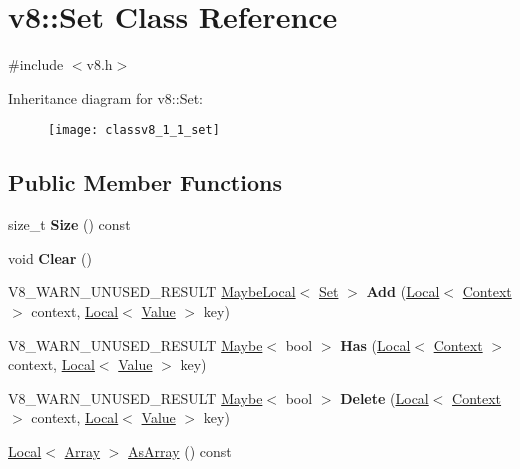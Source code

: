 \hypertarget{classv8_1_1_set}{}\section{v8\+:\+:Set Class Reference}
\label{classv8_1_1_set}


{\ttfamily \#include $<$v8.\+h$>$}

Inheritance diagram for v8\+:\+:Set\+:\begin{figure}[H]
\begin{center}
\leavevmode
\texttt{[image: classv8\_1\_1\_set]}
\end{center}
\end{figure}
\subsection*{Public Member Functions}
\begin{DoxyCompactItemize}
\item 
size\+\_\+t {\bfseries Size} () const \hypertarget{classv8_1_1_set_a7ae1a3522f51a8061813f562086baa91}{}\label{classv8_1_1_set_a7ae1a3522f51a8061813f562086baa91}

\item 
void {\bfseries Clear} ()\hypertarget{classv8_1_1_set_a5f7e4dbd6729a503ca617415d5eeedf0}{}\label{classv8_1_1_set_a5f7e4dbd6729a503ca617415d5eeedf0}

\item 
V8\+\_\+\+W\+A\+R\+N\+\_\+\+U\+N\+U\+S\+E\+D\+\_\+\+R\+E\+S\+U\+LT \hyperlink{classv8_1_1_maybe_local}{Maybe\+Local}$<$ \hyperlink{classv8_1_1_set}{Set} $>$ {\bfseries Add} (\hyperlink{classv8_1_1_local}{Local}$<$ \hyperlink{classv8_1_1_context}{Context} $>$ context, \hyperlink{classv8_1_1_local}{Local}$<$ \hyperlink{classv8_1_1_value}{Value} $>$ key)\hypertarget{classv8_1_1_set_afe7b3f75000e7bca468199e87cea27b7}{}\label{classv8_1_1_set_afe7b3f75000e7bca468199e87cea27b7}

\item 
V8\+\_\+\+W\+A\+R\+N\+\_\+\+U\+N\+U\+S\+E\+D\+\_\+\+R\+E\+S\+U\+LT \hyperlink{classv8_1_1_maybe}{Maybe}$<$ bool $>$ {\bfseries Has} (\hyperlink{classv8_1_1_local}{Local}$<$ \hyperlink{classv8_1_1_context}{Context} $>$ context, \hyperlink{classv8_1_1_local}{Local}$<$ \hyperlink{classv8_1_1_value}{Value} $>$ key)\hypertarget{classv8_1_1_set_ac8703cf3d49bb0142f3425ac57fe0679}{}\label{classv8_1_1_set_ac8703cf3d49bb0142f3425ac57fe0679}

\item 
V8\+\_\+\+W\+A\+R\+N\+\_\+\+U\+N\+U\+S\+E\+D\+\_\+\+R\+E\+S\+U\+LT \hyperlink{classv8_1_1_maybe}{Maybe}$<$ bool $>$ {\bfseries Delete} (\hyperlink{classv8_1_1_local}{Local}$<$ \hyperlink{classv8_1_1_context}{Context} $>$ context, \hyperlink{classv8_1_1_local}{Local}$<$ \hyperlink{classv8_1_1_value}{Value} $>$ key)\hypertarget{classv8_1_1_set_a680215d1b7b1c2c52848f70ae9f6d01a}{}\label{classv8_1_1_set_a680215d1b7b1c2c52848f70ae9f6d01a}

\item 
\hyperlink{classv8_1_1_local}{Local}$<$ \hyperlink{classv8_1_1_array}{Array} $>$ \hyperlink{classv8_1_1_set_a6c295700b7f46dbfaf3165d39e15bd96}{As\+Array} () const 
\end{DoxyCompactItemize}
